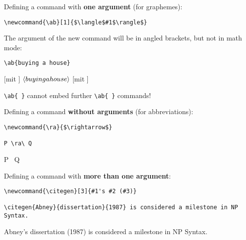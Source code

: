 \begin{frame}[fragile]

Defining a command with \textbf{one argument} (for graphemes):

{\small
\begin{lstlisting}
\newcommand{\ab}[1]{$\langle$#1$\rangle$} 
\end{lstlisting}
}

The argument of the new command will be in angled brackets, but not in math mode:

{\small
\begin{lstlisting}
\ab{buying a house}
\end{lstlisting}
}


\ea 
\ea {} \hfill [mit ]
\ex $\langle buying a house \rangle$ \hfill [mit ]
\z 
\z


\lstinline|\ab{ }| cannot embed further \lstinline|\ab{ }| commands!


\end{frame}


\begin{frame}[fragile]

Defining a command \textbf{without arguments} (for abbreviations):

\begin{multicols}{2}
	
{\small
\begin{lstlisting}
\newcommand{\ra}{$\rightarrow$}

P \ra\ Q
\end{lstlisting}
}

\columnbreak

P \ra\ Q
 
\end{multicols}

\pause

\bigskip 

Defining a command with \textbf{more than one argument}:

{\small
\begin{lstlisting}
\newcommand{\citegen}[3]{#1's #2 (#3)} 

\citegen{Abney}{dissertation}{1987} is considered a milestone in NP Syntax.
\end{lstlisting}
}

\newcommand{\citegen}[3]{#1's #2 (#3)} 

\citegen{Abney}{dissertation}{1987} is considered a milestone in NP Syntax.

\end{frame}



